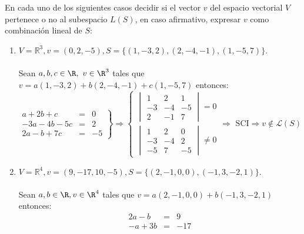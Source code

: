 \begin{ejercicio} En cada uno de los siguientes casos decidir si el vector \( v \) del espacio vectorial \( V \) pertenece o no al subespacio \( L(S) \), en caso afirmativo, expresar \( v \) como combinación lineal de \( S \):
	\begin{enumerate}
		\item \( V = \mathbb{R}^3, v = (0,2,-5), S = \{(1,-3,2), (2,-4,-1), (1,-5,7)\} \).
		      \\ \\ Sean $a,b,c \in \R,\ v \in \R^3 $ tales que $v=a(1,-3,2)+b(2,-4,-1)+c(1,-5,7)$ entonces:
		      \begin{equation*}
			      \left.
			      \begin {array}{rcl}
			      a+2b+c & = & 0 \\
			      -3a-4b-5c & = & 2 \\
			      2a-b+7c & = & -5
			      \end {array}
			      \right\} \Rightarrow
                  \begin{cases}
                    \begin{vmatrix}
                        1  & 2  & 1  \\
                        -3 & -4 & -5 \\
                        2  & -1 & 7
                    \end{vmatrix} = 0  \\
                    \begin{vmatrix}
                        1  & 2  & 0  \\
                        -3 & -4 & 2  \\
                        -5 & 7  & -5
                    \end{vmatrix} \neq 0
                  \end{cases}
			        \Rightarrow \text{ SCI} \Rightarrow v \notin \mathcal{L} (S)
		      \end{equation*}
		\item \( V = \mathbb{R}^4, v = (9,-17,10,-5), S = \{(2,-1,0,0), (-1,3,-2,1)\} \).
		      \\ \\ Sean $a,b \in \R, v \in \R^4$ tales que $v = a(2,-1,0,0)+b(-1,3,-2,1)$ entonces:
		      \begin{equation*}
			      \left.
			      \begin {array}{rcl}
			      2a-b & = & 9 \\
			      -a+3b & = & -17 \\

\end{array}
\end{equation*}
\end{enumerate}
\end{ejercicio}
